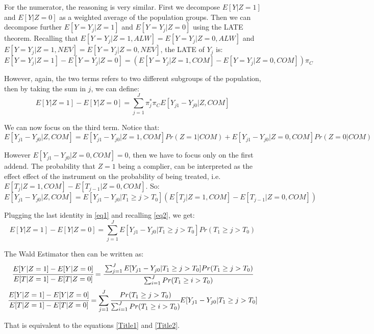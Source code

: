 \documentclass[a4paper,12pt,oneside,English]{article}
\begin{document}
For the numerator, the reasoning is very similar. First we decompose $E[Y|Z=1]$ and $E[Y|Z=0]$ as a weighted average of the population groups. Then we can decompose further $E[Y=Y_j|Z=1]$ and $E[Y=Y_j|Z=0]$ using the LATE theorem. Recalling that $E[Y=Y_j|Z=1, ALW]=E[Y=Y_j|Z=0, ALW]$ and $E[Y=Y_j|Z=1, NEV]=E[Y=Y_j|Z=0, NEV]$, the LATE of $Y_j$ is:
\[
E[Y=Y_j|Z=1]-E[Y=Y_j|Z=0]=(E[Y=Y_j|Z=1, COM]-E[Y=Y_j|Z=0, COM])\pi_C
\]

However, again, the two terms refers to two different subgroups of the population, then by taking the sum in $j$, we can define:
\begin{equation}
    E[Y|Z=1]-E[Y|Z=0]=\sum_{j=1}^J \pi_j^*\pi_C E[Y_{j1}-Y_{j0}|Z,COM]
    \label{eq1}
\end{equation}

We can now focus on the third term. Notice that:
\[
E[Y_{j1}-Y_{j0}|Z,COM]= E[Y_{j1}-Y_{j0}|Z=1,COM]Pr(Z=1|COM)+ E[Y_{j1}-Y_{j0}|Z=0,COM]Pr(Z=0|COM)
\]

However $E[Y_{j1}-Y_{j0}|Z=0,COM]=0$, then we have to focus only on the first addend. The probability that $Z=1$ being a complier, can be interpreted as the effect effect of the instrument on the probability of being treated, i.e. $E[T_j|Z=1, COM]-E[T_{j-1}|Z=0, COM]$. So:
\[
E[Y_{j1}-Y_{j0}|Z,COM]=E[Y_{j1}-Y_{j0}|T_1\geq j>T_0](E[T_j|Z=1, COM]-E[T_{j-1}|Z=0, COM])
\]

Plugging the last identity in \eqref{eq1} and recalling \eqref{eq2}, we get:
\begin{equation}
    E[Y|Z=1]-E[Y|Z=0]=\sum_{j=1}^J E[Y_{j1}-Y_{j0}|T_1\geq j>T_0] Pr(T_1\geq j>T_0) 
\end{equation}

The Wald Estimator then can be written as:
\[
\cfrac{E[Y|Z=1]-E[Y|Z=0]}{E[T|Z=1]-E[T|Z=0]}=\cfrac{\sum_{j=1}^J E[Y_{j1}-Y_{j0}|T_1\geq j>T_0] Pr(T_1\geq j>T_0) }{\sum_{i=1}^J Pr(T_1\geq i>T_0) }
\]
\[
\cfrac{E[Y|Z=1]-E[Y|Z=0]}{E[T|Z=1]-E[T|Z=0]}=\sum_{j=1}^J \cfrac{Pr(T_1\geq j>T_0)}{\sum_{i=1}^J Pr(T_1\geq i>T_0)} E[Y_{j1}-Y_{j0}|T_1\geq j>T_0]
\]

That is equivalent to the equations \eqref{Title1} and \eqref{Title2}.
\end{document}
